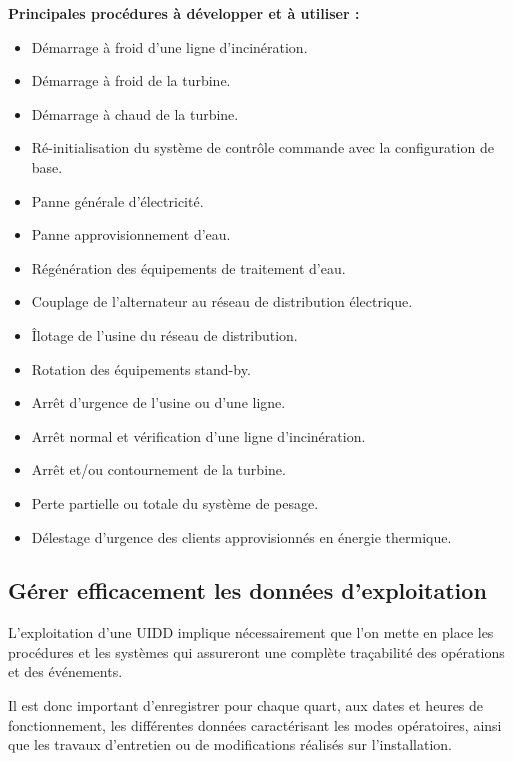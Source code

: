\vspace{0.3cm}

\textbf{	Principales procédures à développer et à utiliser :}
\vspace{0.3cm}
\begin{itemize}

\item Démarrage à froid d’une ligne d’incinération.
\item Démarrage à froid de la turbine.
\item Démarrage à chaud de la turbine.
\item Ré-initialisation du système de contrôle commande avec la configuration de base.
\item Panne générale d’électricité.
\item Panne approvisionnement d’eau.
\item Régénération des équipements de traitement d’eau.
\item Couplage de l’alternateur au réseau de distribution électrique.
\item Îlotage de l’usine du réseau de distribution.
\item Rotation des équipements stand-by.
\item Arrêt d’urgence de l’usine ou d’une ligne.
\item Arrêt normal et vérification d’une ligne d’incinération.
\item Arrêt et/ou contournement de la turbine.
\item Perte partielle ou totale du système de pesage.
\item Délestage d’urgence des clients approvisionnés en énergie thermique.
\end{itemize}

\subsection{	Gérer efficacement les données d'exploitation}

L’exploitation d’une UIDD implique nécessairement que l’on mette en place les procédures et les systèmes qui assureront une complète traçabilité des opérations et des événements.
\vspace{0.3cm} 

Il est donc important d’enregistrer pour chaque quart, aux dates et heures de fonctionnement, les différentes données caractérisant les modes opératoires, ainsi que les travaux d’entretien ou de modifications réalisés sur l’installation.
\vspace{0.3cm} 


